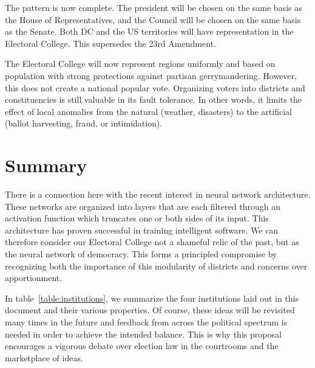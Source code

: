 \documentclass{article}
\begin{document}
The pattern is now complete. The president will be chosen on the same basis as the House of Representatives, and the Council will be chosen on the same basis as the Senate. Both DC and the US territories will have representation in the Electoral College. This supersedes the 23rd Amendment.

The Electoral College will now represent regions uniformly and based on population with strong protections against partisan gerrymandering. However, this does not create a national popular vote. Organizing voters into districts and constituencies is still valuable in its fault tolerance. In other words, it limits the effect of local anomalies from the natural (weather, disasters) to the artificial (ballot harvesting, fraud, or intimidation).

\section{Summary}

There is a connection here with the recent interest in neural network architecture. These networks are organized into layers that are each filtered through an activation function which truncates one or both sides of its input. This architecture has proven successful in training intelligent software. We can therefore consider our Electoral College not a shameful relic of the past, but as the neural network of democracy. This forms a principled compromise by recognizing both the importance of this modularity of districts and concerns over apportionment.

In table~\ref{table:institutions}, we summarize the four institutions laid out in this document and their various properties. Of course, these ideas will be revisited many times in the future and feedback from across the political spectrum is needed in order to achieve the intended balance. This is why this proposal encourages a vigorous debate over election law in the courtrooms and the marketplace of ideas.
\end{document}

